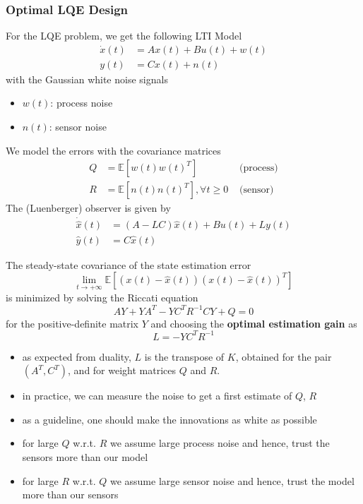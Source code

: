 \subsubsection{Optimal LQE Design}
For the LQE problem, we get the following LTI Model
\begin{align*}
    \dot{x}(t) & = Ax(t)+Bu(t)+w(t) \\
    y(t)       & = Cx(t)+n(t)
\end{align*}
with the Gaussian white noise signals
\begin{itemize}
    \item $w(t)$: process noise
    \item $n(t)$: sensor noise
\end{itemize}
We model the errors with the covariance matrices
\begin{align*}
    Q & =\mathbb{E}[w(t)w(t)^T]                 & \text{ (process)} \\
    R & =\mathbb{E}[n(t)n(t)^T], \forall t\geq0 & \text{ (sensor)}
\end{align*}
The (Luenberger) observer is given by
\begin{align*}
    \dot{\hat{x}}(t) & =(A-LC)\hat{x}(t)+Bu(t)+Ly(t) \\
    \hat{y}(t)       & =C\hat{x}(t)
\end{align*}


The steady-state covariance of the state estimation error
\begin{equation*}
    \lim_{t\to+\infty}\mathbb{E}\left[(x(t)-\hat{x}(t))(x(t)-\hat{x}(t))^T\right]
\end{equation*}
is minimized by solving the Riccati equation
\begin{equation*}
    AY+YA^T-YC^TR^{-1}CY+Q=0
\end{equation*}
for the positive-definite matrix $Y$ and choosing the \textbf{optimal estimation gain} as
\begin{equation*}
    L=-YC^T R^{-1}
\end{equation*}


\begin{itemize}
    \item as expected from duality, $L$ is the transpose of $K$, obtained for the pair $(A^T, C^T)$, and for weight matrices $Q$ and $R$.
    \item in practice, we can measure the noise to get a first estimate of $Q$, $R$
    \item as a guideline, one should make the innovations as white as possible
    \item for large $Q$ w.r.t. $R$ we assume large process noise and hence, trust the sensors more than our model
    \item for large $R$ w.r.t. $Q$ we assume large sensor noise and hence, trust the model more than our sensors
\end{itemize}
